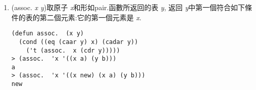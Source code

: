 \documentclass[12pt]{article}
\begin{document}
\begin{CJK}{UTF8}{bsmi}
\begin{enumerate}
\begin{verbatim} 
(defun pair.  (x y) 
(cond ((and.  (null.  x) (null.  y)) '()) 
  ((and.  (not.  (atom x)) (not.  (atom y))) 
    (cons (list (car x) (car y)) (pair.  (cdr) (cdr y)))))) 
> (pair.  '(x y z) '(a b c)) 
((x a) (y b) (z c)) 
\end{verbatim} 
\item 
(assoc. 
{\it 
x 
y})取原子{\it 
x}和形如pair.函數所返回的表{\it 
y}, 返回{\it 
y}中第一個符合如下條 
件的表的第二個元素:它的第一個元素是{\it 
x}. 
\begin{verbatim} 
(defun assoc.  (x y) 
  (cond ((eq (caar y) x) (cadar y)) 
    ('t (assoc.  x (cdr y))))) 
> (assoc.  'x '((x a) (y b))) 
a 
> (assoc.  'x '((x new) (x a) (y b))) 
new 
\end{verbatim} 
\end{enumerate} 

\end{CJK}
\end{document}
